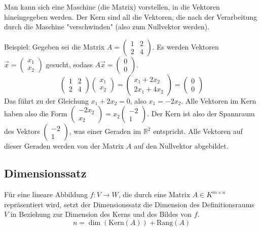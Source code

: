 Man kann sich eine Maschine (die Matrix) vorstellen, in die Vektoren hineingegeben werden. Der Kern sind all die Vektoren, die nach der Verarbeitung durch die Maschine "verschwinden" (also zum Nullvektor werden).

Beispiel:
Gegeben sei die Matrix \(A = \begin{pmatrix} 1 & 2 \\ 2 & 4 \end{pmatrix}\). Es werden Vektoren \(\vec{x} = \begin{pmatrix} x_1 \\ x_2 \end{pmatrix}\) gesucht, sodass \(A\vec{x} = \begin{pmatrix} 0 \\ 0 \end{pmatrix}\).
\[ \begin{pmatrix} 1 & 2 \\ 2 & 4 \end{pmatrix} \begin{pmatrix} x_1 \\ x_2 \end{pmatrix} = \begin{pmatrix} x_1 + 2x_2 \\ 2x_1 + 4x_2 \end{pmatrix} = \begin{pmatrix} 0 \\ 0 \end{pmatrix} \]
Das führt zu der Gleichung \(x_1 + 2x_2 = 0\), also \(x_1 = -2x_2\).
Alle Vektoren im Kern haben also die Form \(\begin{pmatrix} -2x_2 \\ x_2 \end{pmatrix} = x_2 \begin{pmatrix} -2 \\ 1 \end{pmatrix}\).
Der Kern ist also der Spannraum des Vektors \(\begin{pmatrix} -2 \\ 1 \end{pmatrix}\), was einer Geraden im \(\mathbb{R}^2\) entspricht. Alle Vektoren auf dieser Geraden werden von der Matrix \(A\) auf den Nullvektor abgebildet.

\subsection{Dimensionssatz}
Für eine lineare Abbildung \(f: V \to W\), die durch eine Matrix \(A \in K^{m \times n}\) repräsentiert wird, setzt der Dimensionssatz die Dimension des Definitionsraums \(V\) in Beziehung zur Dimension des Kerns und des Bildes von \(f\).
\[
    n = \dim(\mathrm{Kern}(A)) + \mathrm{Rang}(A)
\]

